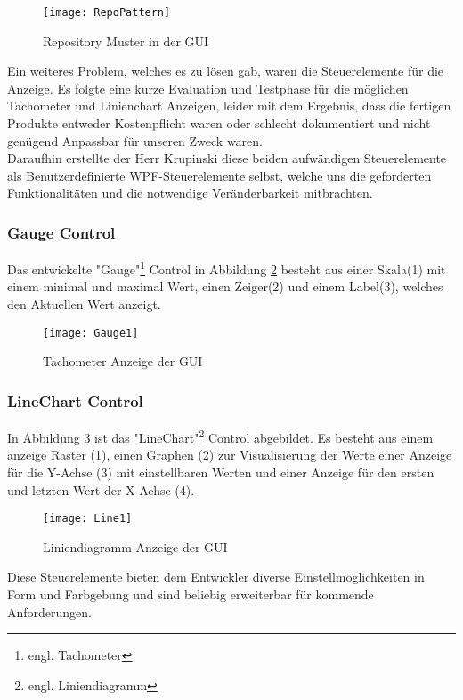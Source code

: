 \begin{figure}[h]
	\centering
		\texttt{[image: RepoPattern]}
		\caption{Repository Muster in der GUI}
		\label{fig:repo}
\end{figure}

Ein weiteres Problem, welches es zu lösen gab, waren die Steuerelemente für die Anzeige. Es folgte eine kurze Evaluation und Testphase für die möglichen Tachometer und Linienchart Anzeigen, leider mit dem Ergebnis, dass die fertigen Produkte entweder Kostenpflicht waren oder schlecht dokumentiert und nicht genügend Anpassbar für unseren Zweck waren.\\

Daraufhin erstellte der Herr Krupinski diese beiden aufwändigen Steuerelemente als Benutzerdefinierte WPF-Steuerelemente selbst, welche uns die geforderten Funktionalitäten und die notwendige Veränderbarkeit mitbrachten. 

\subsubsection*{Gauge Control}
Das entwickelte "Gauge"\footnote{engl. Tachometer} Control in Abbildung \ref{fig:gauge} besteht aus einer Skala(1) mit einem minimal und maximal Wert, einen Zeiger(2) und einem Label(3), welches den Aktuellen Wert anzeigt.

\begin{figure}[h]
	\centering
		\texttt{[image: Gauge1]}
		\caption{Tachometer Anzeige der GUI}
		\label{fig:gauge}
\end{figure}

\subsubsection*{LineChart Control}

In Abbildung \ref{fig:line} ist das "LineChart"\footnote{engl. Liniendiagramm} Control abgebildet. Es besteht aus einem anzeige Raster (1), einen Graphen (2) zur Visualisierung der Werte einer Anzeige für die Y-Achse (3) mit einstellbaren Werten und einer Anzeige für den ersten und letzten Wert der X-Achse (4).

\begin{figure}[h]
	\centering
		\texttt{[image: Line1]}
		\caption{Liniendiagramm Anzeige der GUI}
		\label{fig:line}
\end{figure}

Diese Steuerelemente bieten dem Entwickler diverse Einstellmöglichkeiten in Form und Farbgebung und sind beliebig erweiterbar für kommende Anforderungen.\\

